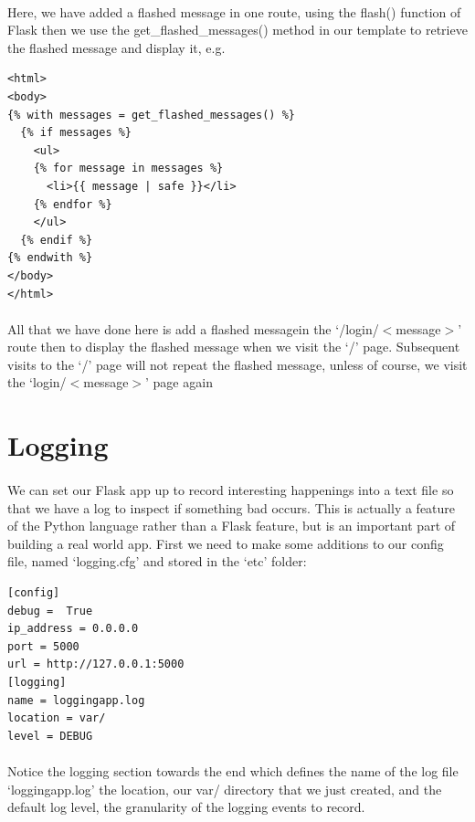 \documentclass[12pt, a4paper, oneside]{book}
\begin{document}
\paragraph{} Here, we have added a flashed message in one route, using the flash() function of Flask then we use the get\_flashed\_messages() method in our template to retrieve the flashed message and display it, e.g.

\begin{lstlisting}
<html>
<body>
{% with messages = get_flashed_messages() %}
  {% if messages %}
    <ul>
    {% for message in messages %}
      <li>{{ message | safe }}</li>
    {% endfor %}
    </ul>
  {% endif %}
{% endwith %}
</body>
</html>
\end{lstlisting}

\paragraph{} All that we have done here is add a flashed messagein the `/login/$<$message$>$' route then to display the flashed message when we visit the `/' page. Subsequent visits to the `/' page will not repeat the flashed message, unless of course, we visit the `login/$<$message$>$' page again

\section{Logging}
\label{logging}
\paragraph{} We can set our Flask app up to record interesting happenings into a text file so that we have a log to inspect if something bad occurs. This is actually a feature of the Python language rather than a Flask feature, but is an important part of building a real world app. First we need to make some additions to our config file, named `logging.cfg' and stored in the  `etc' folder:

\begin{lstlisting}
[config]
debug =  True
ip_address = 0.0.0.0
port = 5000
url = http://127.0.0.1:5000
[logging]
name = loggingapp.log
location = var/
level = DEBUG
\end{lstlisting}
\paragraph{} Notice the logging section towards the end which defines the name of the log file `loggingapp.log' the location, our var/ directory that we just created, and the default log level, the granularity of the logging events to record. 
\end{document}
